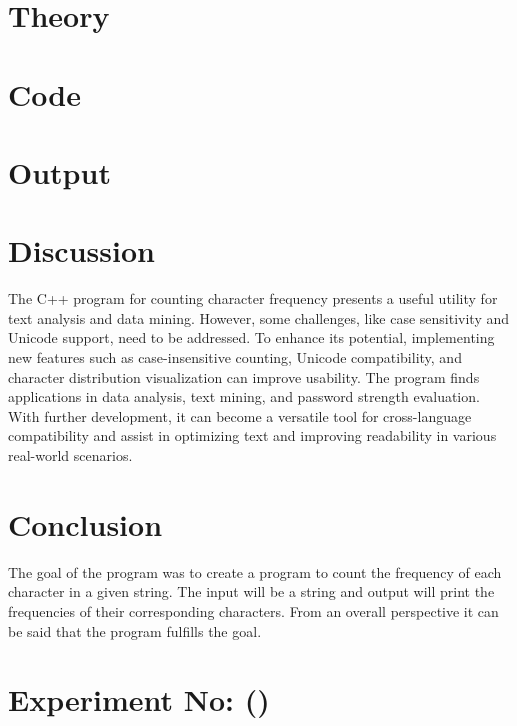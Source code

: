 \documentclass{report}
\newcounter{exp_no}
\begin{document}
\section*{Theory}


\section*{Code}


\section*{Output}
\begin{tcolorbox}[colback=black, coltext=white, fontupper=\ttfamily\small,sharp corners ]
    
\end{tcolorbox}

\section*{Discussion}
The C++ program for counting character frequency presents a useful utility for text analysis and data mining. However, some challenges, like case sensitivity and Unicode support, need to be addressed. To enhance its potential, implementing new features such as case-insensitive counting, Unicode compatibility, and character distribution visualization can improve usability. The program finds applications in data analysis, text mining, and password strength evaluation. With further development, it can become a versatile tool for cross-language compatibility and assist in optimizing text and improving readability in various real-world scenarios.

\section*{Conclusion}
The goal of the program was to create a program to count the frequency of each character in a given string. The input will be a string and output will print the frequencies of their corresponding characters. From an  overall perspective it can be said that the program fulfills the goal.




\section*{Experiment No:  \thechapter ()}
\end{document}
